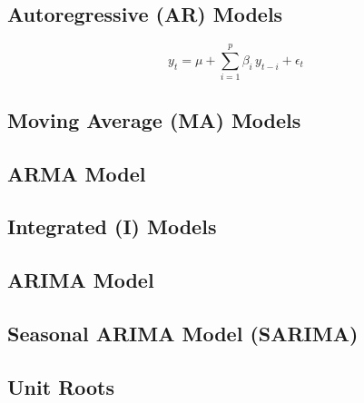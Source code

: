 \subsection{Autoregressive (AR) Models}
\label{additional:time_series:AR}

\begin{equation}\label{eq:time_series:AR}
y_{t} = \mu + \sum_{i=1}^{p} \beta_{i}\, y_{t-i} + \epsilon_{t}
\end{equation}

\subsection{Moving Average (MA) Models}
\label{additional:time_series:MA}

\subsection{ARMA Model}
\label{additional:time_series:ARMA}
\subsection{Integrated (I) Models}
\label{additional:time_series:I}

\subsection{ARIMA Model}
\label{additional:time_series:ARIMA}

\subsection{Seasonal ARIMA Model (SARIMA)}
\label{additional:time_series:SARIMA}

\subsection{Unit Roots}
\label{additional:time_series:unit_root}


